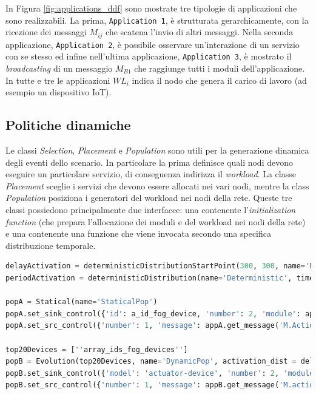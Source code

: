 In Figura \ref{fig:applications_ddf} sono mostrate tre tipologie di applicazioni che sono realizzabili. La prima, \texttt{Application 1}, è strutturata gerarchicamente, con la ricezione dei messaggi $M_{ij}$ che scatena l'invio di altri messaggi. Nella seconda applicazione, \texttt{Application 2}, è possibile osservare un'interazione di un servizio con se stesso ed infine nell'ultima applicazione, \texttt{Application 3}, è mostrato il \textit{broadcasting} di un messaggio $M_{B1}$ che raggiunge tutti i moduli dell'applicazione. In tutte e tre le applicazioni $WL_i$ indica il nodo che genera il carico di lavoro (ad esempio un dispositivo IoT).

\subsection{Politiche dinamiche}
Le classi \textit{Selection}, \textit{Placement} e \textit{Population} sono utili per la generazione dinamica degli eventi dello scenario. In particolare la prima definisce quali nodi devono eseguire un particolare servizio, di conseguenza indirizza il \textit{workload}. La classe \textit{Placement} sceglie i servizi che devono essere allocati nei vari nodi, mentre la class \textit{Population} posiziona i generatori del workload nei nodi della rete. Queste tre classi possiedono principalmente due interfacce: una contenente l'\textit{initialization function} (che prepara l'allocazione dei moduli e del workload nei nodi della rete) e una contenente una funzione che viene invocata secondo una specifica distribuzione temporale.

\begin{lstlisting}[language=python, caption={Definizione di due Population policies: una statica (\texttt{popA}) ed una dinamica (\texttt{popB}) \cite{YAFSSimulator}}, captionpos=b, label={lst:population-policy}]
delayActivation = deterministicDistributionStartPoint(300, 300, name='Deterministic')
periodActivation = deterministicDistribution(name='Deterministic', time=100)

popA = Statical(name='StaticalPop')
popA.set_sink_control({'id': a_id_fog_device, 'number': 2, 'module': appA.get_sink_modules()})
popA.set_src_control({'number': 1, 'message': appA.get_message('M.Action'), 'distribution': periodicActivation})

top20Devices = [''array_ids_fog_devices'']
popB = Evolution(top20Devices, name='DynamicPop', activation_dist = delayActivation)
popB.set_sink_control({'model': 'actuator-device', 'number': 2, 'module': appB.get_sink_control()})
popB.set_src_control({'number': 1, 'message': appB.get_message('M.action'), 'distribution': periodicActivation})

\end{lstlisting}

